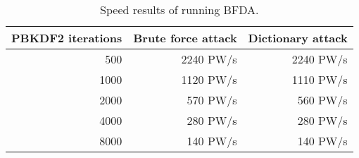 \begin{table}[!h]
    \centering
    \caption{Speed results of running \ac{BFDA}. 
}
    \label{tab:res_bf}
    \begin{tabular}{| r | r | r |}
	\hline
	\ac{PBKDF2} iterations          &Brute force attack	    &Dictionary attack	\\
	\hline
	500                             &2240 PW/s                &2240 PW/s	\\
	\hline
	1000                            &1120 PW/s                &1110 PW/s	\\
	\hline
	2000                            &570 PW/s                 &560 PW/s	\\
	\hline
	4000                            &280 PW/s                 &280 PW/s	\\
	\hline
    8000                            &140 PW/s                 &140 PW/s \\
    \hline
    \end{tabular}
\end{table}
